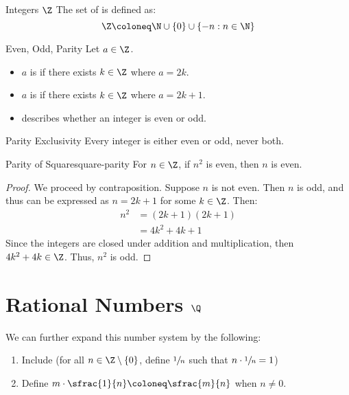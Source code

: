 \begin{dfnbox}{Integers $\Z$}{}
    The set of  is defined as:
    \[ \Z \coloneq \N \cup \{0\} \cup \{ -n : n \in \N \} \]
\end{dfnbox}

\begin{dfnbox}{Even, Odd, Parity}{}
    Let $a \in \Z$.
    \begin{itemize}[noitemsep]
        \item $a$ is  if there exists $k \in \Z$ where $a = 2k$.
        \item $a$ is  if there exists $k \in \Z$ where $a = 2k+1$.
        \item {} describes whether an integer is even or odd.
    \end{itemize}
\end{dfnbox}

\begin{thmbox}{Parity Exclusivity}{}
    Every integer is either even or odd, never both.
    \tcblower
\end{thmbox}

\begin{exbox}{Parity of Square}{square-parity}
    For $n \in \Z$, if $n^2$ is even, then $n$ is even.
    \tcblower
    \begin{proof}
        We proceed by contraposition. Suppose $n$ is not even. Then $n$ is odd, and thus can be expressed as $n = 2k+1$ for some $k \in \Z$. Then:
        \begin{align*}
            n^2 &= (2k+1)(2k+1) \\
            &= 4k^2 + 4k + 1
        \end{align*}
        Since the integers are closed under addition and multiplication, then $4k^2 + 4k \in \Z$. Thus, $n^2$ is odd.
    \end{proof}
\end{exbox}

\section{Rational Numbers $\Q$}

We can further expand this number system by the following:
\begin{enumerate}
    \item Include  (for all $n \in \Z \setminus \{0\}$, define $\sfrac{1}{n}$ such that $n \cdot \sfrac{1}{n} = 1$)
    \item Define $m \cdot \sfrac{1}{n} \coloneq \sfrac{m}{n}$ when $n \neq 0$.
\end{enumerate}

